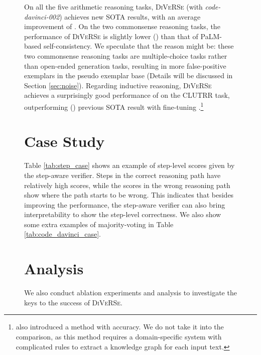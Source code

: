 \documentclass[11pt,a4paper]{article}
\begin{document}
\begin{figure}[t]
\begin{tcolorbox}[colback=blue!5!white,colframe=blue!75!black,title=Chain-Of-Thought Reasoning for GSM8K Math Word Problem,fontupper=\footnotesize,fonttitle=\scriptsize]
On all the five arithmetic reasoning tasks, \textsc{DiVeRSe} (with \emph{code-davinci-002}) achieves new SOTA results, with an average improvement of .
On the two commonsense reasoning tasks, the performance of \textsc{DiVeRSe} is slightly lower () than that of PaLM-based self-consistency.
We speculate that the reason might be: these two commonsense reasoning tasks are multiple-choice tasks rather than open-ended generation tasks, resulting in more false-positive exemplars in the pseudo exemplar base (Details will be discussed in Section \ref{sec:noise}).
Regarding inductive reasoning, \textsc{DiVeRSe} achieves a surprisingly good performance of  on the CLUTRR task, outperforming ()  previous SOTA result with fine-tuning \cite{sinha2019clutrr}.\footnote{\citet{sinha2019clutrr} also introduced a method with  accuracy. We do not take it into the comparison, as this method requires a domain-specific system with complicated rules to extract a knowledge graph for each input text.}

\section{Case Study}


Table \ref{tab:step_case} shows an example of step-level scores given by the step-aware verifier.
Steps in the correct reasoning path have relatively high scores, while the scores in the wrong reasoning path show where the path starts to be wrong.
This indicates that besides improving the performance, the step-aware verifier can also bring interpretability to show the step-level correctness.
We also show some extra examples of majority-voting in Table \ref{tab:code_davinci_case}.


\section{Analysis}
We also conduct ablation experiments and analysis to investigate the keys to the success of \textsc{DiVeRSe}.


\end{tcolorbox}
\end{figure}
\end{document}
